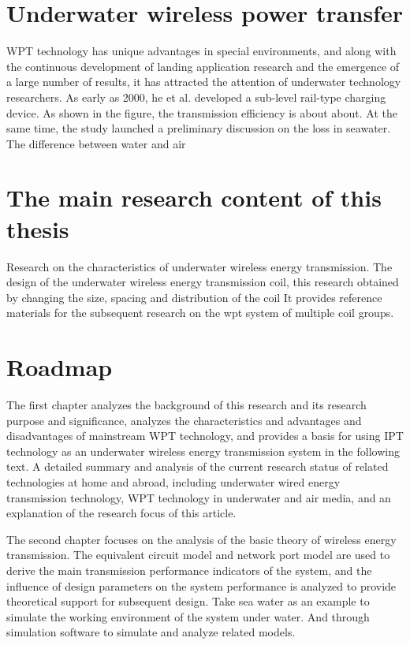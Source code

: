 \section{Underwater wireless power transfer}
WPT technology has unique advantages in special environments, and along with the continuous development of landing application research and the emergence of a large number of results, it has attracted the attention of underwater technology researchers. As early as 2000, he et al. developed a sub-level rail-type charging device. As shown in the figure, the transmission efficiency is about about. At the same time, the study launched a preliminary discussion on the loss in seawater.
The difference between water and air


\section{The main research content of this thesis}
Research on the characteristics of underwater wireless energy transmission.
The design of the underwater wireless energy transmission coil, this research obtained by changing the size, spacing and distribution of the coil
It provides reference materials for the subsequent research on the wpt system of multiple coil groups.

\section{Roadmap}
The first chapter analyzes the background of this research and its research purpose and significance, analyzes the characteristics and advantages and disadvantages of mainstream WPT technology, and provides a basis for using IPT technology as an underwater wireless energy transmission system in the following text. A detailed summary and analysis of the current research status of related technologies at home and abroad, including underwater wired energy transmission technology, WPT technology in underwater and air media, and an explanation of the research focus of this article.

The second chapter focuses on the analysis of the basic theory of wireless energy transmission. The equivalent circuit model and network port model are used to derive the main transmission performance indicators of the system, and the influence of design parameters on the system performance is analyzed to provide theoretical support for subsequent design. Take sea water as an example to simulate the working environment of the system under water. And through simulation software to simulate and analyze related models.

